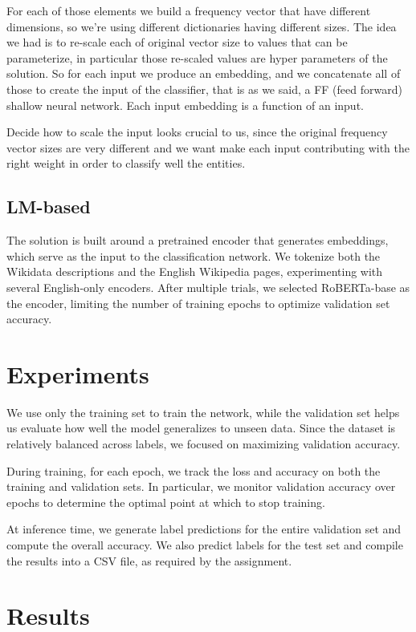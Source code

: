 \documentclass[11pt]{article}
\begin{document}
	For each of those elements we build a frequency vector that have different dimensions, so we're using different dictionaries having different sizes. The idea we had is to re-scale each of original vector size to values that can be parameterize, in particular those re-scaled values are hyper parameters of the solution. So for each input we produce an embedding, and we concatenate all of those to create the input of the classifier, that is as we said, a FF (feed forward) shallow neural network. Each input embedding is a function of an input.
	
	Decide how to scale the input looks crucial to us, since the original frequency vector sizes are very different and we want make each input contributing with the right weight in order to classify well the entities. 
	
	\subsection{LM-based}
	The solution is built around a pretrained encoder that generates embeddings, which serve as the input to the classification network. We tokenize both the Wikidata descriptions and the English Wikipedia pages, experimenting with several English-only encoders. After multiple trials, we selected RoBERTa-base as the encoder, limiting the number of training epochs to optimize validation set accuracy.

	\section{Experiments}
	We use only the training set to train the network, while the validation set helps us evaluate how well the model generalizes to unseen data. Since the dataset is relatively balanced across labels, we focused on maximizing validation accuracy.
	
	During training, for each epoch, we track the loss and accuracy on both the training and validation sets. In particular, we monitor validation accuracy over epochs to determine the optimal point at which to stop training.
	
	At inference time, we generate label predictions for the entire validation set and compute the overall accuracy. We also predict labels for the test set and compile the results into a CSV file, as required by the assignment.
	
	\section{Results}
	
\end{document}

